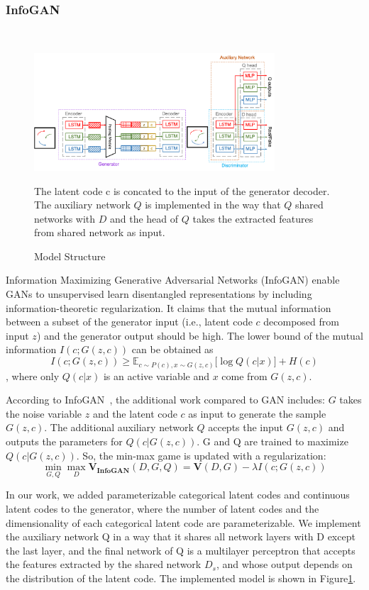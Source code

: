 \subsubsection{InfoGAN}
\hfill \\
\begin{figure}[ht]
  \centering
  \includegraphics[width=0.8\textwidth]{figures/arch.png}
  \caption{Model Structure}{The latent code c is concated to the input of the generator decoder. The auxiliary network $Q$ is implemented in the way that $Q$ shared networks with $D$ and the head of $Q$ takes the extracted features from shared network as input.}
  \label{arch}
\end{figure}
Information Maximizing Generative Adversarial Networks (InfoGAN) enable GANs to unsupervised learn disentangled representations by including information-theoretic regularization. It claims that the mutual information between a subset of the generator input (i.e., latent code $c$ decomposed from input $z$) and the generator output should be high. The lower bound of the mutual information $I(c; G(z, c))$ can be obtained as $$I(c; G(z, c)) \geq \mathbb{E}_{c \sim P(c), x \sim G(z, c)} \lbrack \log Q(c | x) \rbrack + H(c)$$, where only $Q(c | x)$ is an active variable and $x$ come from $G(z, c)$.

According to InfoGAN~\cite{infogan}, the additional work compared to GAN includes: $G$ takes the noise variable $z$ and the latent code $c$ as input to generate the sample $G(z, c)$. The additional auxiliary network $Q$ accepts the input $G(z, c)$ and outputs the parameters for $Q(c|G(z, c))$. G and Q are trained to maximize $Q(c | G(z, c))$. So, the min-max game is updated with a regularization: \[\min_{G,Q}\max_{D} \mathbf{V_{InfoGAN}}(D, G, Q) = \mathbf{V}(D, G) - \lambda I(c; G(z, c)) \]

In our work, we added parameterizable categorical latent codes and continuous latent codes to the generator, where the number of latent codes and the dimensionality of each categorical latent code are parameterizable. We implement the auxiliary network Q in a way that it shares all network layers with D except the last layer, and the final network of Q is a multilayer perceptron that accepts the features extracted by the shared network $D_s$, and whose output depends on the distribution of the latent code. The implemented model is shown in Figure\ref{arch}.



